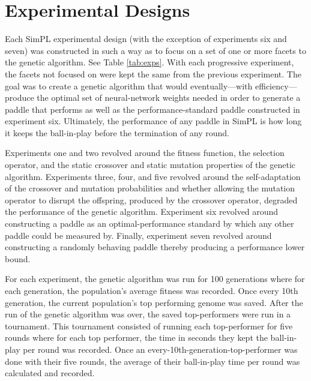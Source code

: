 \section{Experimental Designs}

Each SimPL experimental design (with the exception of experiments six and seven) was constructed in such a way as to focus on a set of one or more facets to the genetic algorithm. See Table \ref{tab:exps}. With each progressive experiment, the facets not focused on were kept the same from the previous experiment. The goal was to create a genetic algorithm that would eventually---with efficiency---produce the optimal set of neural-network weights needed in order to generate a paddle that performs as well as the performance-standard paddle constructed in experiment six. Ultimately, the performance of any paddle in SimPL is how long it keeps the ball-in-play before the termination of any round.       

Experiments one and two revolved around the fitness function, the selection operator, and the static crossover and static mutation properties of the genetic algorithm. Experiments three, four, and five revolved around the self-adaptation of the crossover and mutation probabilities and whether allowing the mutation operator to disrupt the offspring, produced by the crossover operator, degraded the performance of the genetic algorithm. Experiment six revolved around constructing a paddle as an optimal-performance standard by which any other paddle could be measured by. Finally, experiment seven revolved around constructing a randomly behaving paddle thereby producing a performance lower bound.

For each experiment, the genetic algorithm was run for 100 generations where for each generation, the population's average fitness was recorded. Once every 10th generation, the current population's top performing genome was saved. After the run of the genetic algorithm was over, the saved top-performers were run in a tournament. This tournament consisted of running each top-performer for five rounds where for each top performer, the time in seconds they kept the ball-in-play per round was recorded. Once an every-10th-generation-top-performer was done with their five rounds, the average of their ball-in-play time per round was calculated and recorded.

